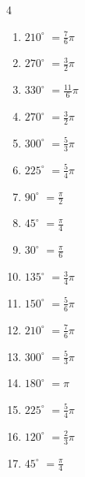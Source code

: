 \begin{multicols}{4}
\begin{enumerate}
  \item $\displaystyle 210^{\circ}$
        $\displaystyle =\frac{7}{6}\pi$

  \item $\displaystyle 270^{\circ}$
        $\displaystyle =\frac{3}{2}\pi$

  \item $\displaystyle 330^{\circ}$
        $\displaystyle =\frac{11}{6}\pi$

  \item $\displaystyle 270^{\circ}$
        $\displaystyle =\frac{3}{2}\pi$

  \item $\displaystyle 300^{\circ}$
        $\displaystyle =\frac{5}{3}\pi$

  \item $\displaystyle 225^{\circ}$
        $\displaystyle =\frac{5}{4}\pi$

\columnbreak %

  \item $\displaystyle 90^{\circ}$
        $\displaystyle =\frac{\pi}{2}$

  \item $\displaystyle 45^{\circ}$
        $\displaystyle =\frac{\pi}{4}$

  \item $\displaystyle 30^{\circ}$
        $\displaystyle =\frac{\pi}{6}$

  \item $\displaystyle 135^{\circ}$
        $\displaystyle =\frac{3}{4}\pi$

  \item $\displaystyle 150^{\circ}$
        $\displaystyle =\frac{5}{6}\pi$

  \item $\displaystyle 210^{\circ}$
        $\displaystyle =\frac{7}{6}\pi$

  \item $\displaystyle 300^{\circ}$
        $\displaystyle =\frac{5}{3}\pi$

  \item $\displaystyle 180^{\circ}$
        $\displaystyle =\pi$

  \item $\displaystyle 225^{\circ}$
        $\displaystyle =\frac{5}{4}\pi$

  \item $\displaystyle 120^{\circ}$
        $\displaystyle =\frac{2}{3}\pi$

  \item $\displaystyle 45^{\circ}$
        $\displaystyle =\frac{\pi}{4}$


\end{enumerate}
\end{multicols}
